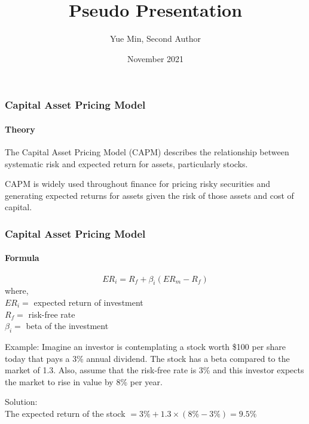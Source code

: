 \documentclass[10pt]{beamer}
\title{Pseudo Presentation}
\author{Yue Min, Second Author}
\institute{University of Zurich, Second Affiliation}
\date{November 2021}
\begin{document}
\frame{\titlepage}
\begin{frame}
    \frametitle{Capital Asset Pricing Model}
    \framesubtitle{Theory}
    \begin{theorem}
        The Capital Asset Pricing Model (CAPM) describes the relationship between systematic risk and expected return for assets, particularly stocks. \\
        
    \end{theorem}
    
    \vspace{5mm}
    
    CAPM is widely used throughout finance for pricing risky securities and generating expected returns for assets given the risk of those assets and cost of capital.

    \end{frame}

\begin{frame}
    \frametitle{Capital Asset Pricing Model}
    \framesubtitle{Formula}
    \begin{equation}
        ER_{i} = R_{f} + \beta_{i}(ER_{m}-R_{f})
    \end{equation}
    where, \\
    $ER_{i} =$ expected return of investment \\
    $R_{f} =$ risk-free rate \\
    $\beta_{i} =$ beta of the investment
    \vspace{5mm}

    Example: Imagine an investor is contemplating a stock worth \$100 per share today that pays a 3\% annual dividend. The stock has a beta compared to the market of 1.3. Also, assume that the risk-free rate is 3\% and this investor expects the market to rise in value by 8\% per year.\\
    
    \vspace{5mm}
    
    Solution: \\
    The expected return of the stock $ = 3\% + 1.3\times(8\% - 3\%) = 9.5\% $
\end{frame}
\end{document}
